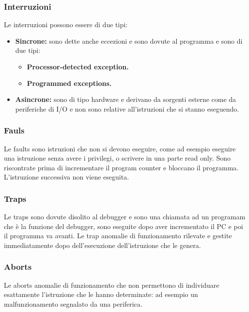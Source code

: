 \documentclass{article}
\begin{document}
\subsubsection{Interruzioni}
Le interruzioni possono essere di due tipi:
\begin{itemize}
    \item \textbf{Sincrone:} sono dette anche eccezioni e sono dovute al programma e sono di due tipi:
    \begin{itemize}
        \item \textbf{Processor-detected exception.}
        \item \textbf{Programmed exceptions.}
    \end{itemize}
    \item \textbf{Asincrone:} sono di tipo hardware e derivano da sorgenti esterne come da periferiche di I/O e non sono relative all’istruzioni che si stanno eseguendo.
\end{itemize}

\subsubsection{Fauls}
Le faults sono istruzioni che non si devono eseguire, come ad esempio eseguire una istruzione senza avere i privilegi, o scrivere in una parte read only. Sono riscontrate prima di incrementare il program counter e bloccano il programma. L'istruzione successiva non viene eseguita.

\subsubsection{Traps}
Le traps sono dovute disolito al debugger e sono una chiamata ad un programam che è la funzione del debugger, sono eseguite dopo aver incrementato il PC e poi il programma va avanti. Le trap anomalie di funzionamento rilevate e gestite immediatamente dopo dell'esecuzione dell'istruzione che le genera.

\subsubsection{Aborts}
Le aborts anomalie di funzionamento che non permettono di individuare esattamente l'istruzione che le hanno determinate: ad esempio un malfunzionamento segnalato da una periferica.
\end{document}

